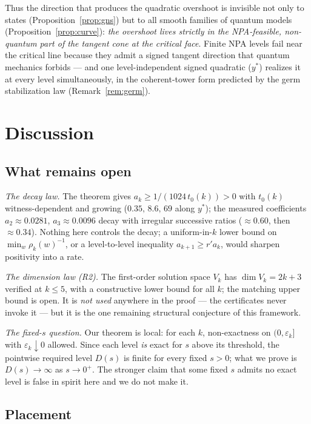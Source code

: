\documentclass[11pt]{article}
\newcommand{\eps}{\varepsilon}
\begin{document}
Thus the direction that produces the quadratic overshoot is invisible not
only to states (Proposition~\ref{prop:gns}) but to all smooth families of
quantum models (Proposition~\ref{prop:curve}): \emph{the overshoot lives
strictly in the NPA-feasible, non-quantum part of the tangent cone at the
critical face}. Finite NPA levels fail near the critical line because
they admit a signed tangent direction that quantum mechanics forbids ---
and one level-independent signed quadratic ($y^\ast$) realizes it at
every level simultaneously, in the coherent-tower form predicted by the
germ stabilization law (Remark~\ref{rem:germ}).

\section{Discussion}\label{sec:discussion}

\subsection{What remains open}

\emph{The decay law.} The theorem gives $a_k\ge1/(1024\,t_0(k))>0$ with
$t_0(k)$ witness-dependent and growing ($0.35,\,8.6,\,69$ along
$y^\ast$); the measured coefficients $a_2\approx0.0281$,
$a_3\approx0.0096$ \cite{overshoot} decay with irregular successive
ratios ($\approx0.60$, then $\approx0.34$). Nothing here controls the decay; a uniform-in-$k$ lower
bound on $\min_w\rho_k(w)^{-1}$, or a level-to-level inequality
$a_{k+1}\ge r'a_k$, would sharpen positivity into a rate.

\emph{The dimension law (R2).} The first-order solution space $V_k$ has
$\dim V_k=2k+3$ verified at $k\le5$, with a constructive lower bound for
all $k$; the matching upper bound is open. It is \emph{not used}
anywhere in the proof --- the certificates never invoke it --- but it is
the one remaining structural conjecture of this framework.

\emph{The fixed-$s$ question.} Our theorem is local: for each $k$,
non-exactness on $(0,\eps_k]$ with $\eps_k\downarrow0$ allowed. Since
each level \emph{is} exact for $s$ above its threshold, the pointwise
required level $D(s)$ is finite for every fixed $s>0$; what we prove is
$D(s)\to\infty$ as $s\to0^+$. The stronger claim that some fixed $s$
admits no exact level is false in spirit here and we do not make it.

\subsection{Placement}
\end{document}
